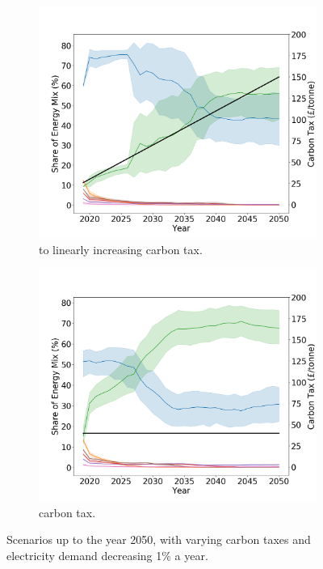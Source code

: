 \begin{figure}[h]
	\begin{subfigure}[b]{0.475\textwidth}   
		\centering 
		\includegraphics[width=\textwidth]{figures/scenarios/demand099-carbon18-datetime.png}
		\caption[]%
		{{ to  linearly increasing carbon tax.}}    
		\label{fig:demand99carbon18}
	\end{subfigure}
	\quad
	\begin{subfigure}[b]{0.475\textwidth}   
		\centering 
		\includegraphics[width=\textwidth]{figures/scenarios/demand099-carbon40-datetime.png}
		\caption[]%
		{{ carbon tax.}}    
		\label{fig:demand99carbon40}
	\end{subfigure}
	\caption[ Scenarios up to the year 2050 with varying carbon taxes and decreasing demand ]
	{\small Scenarios up to the year 2050, with varying carbon taxes and electricity demand decreasing 1\% a year.} 
	\label{fig:mean and std of nets}
\end{figure}








